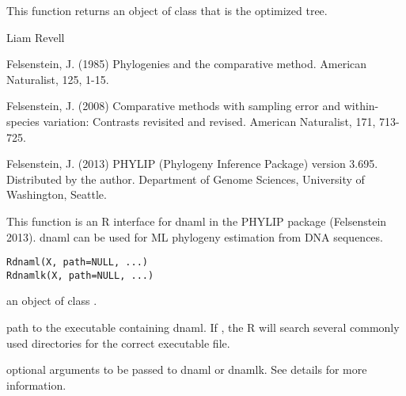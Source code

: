 \documentclass[a4paper]{book}
\begin{document}
%
\begin{Value}
This function returns an object of class  that is the optimized tree.
\end{Value}
%
\begin{Author}\relax
Liam Revell 
\end{Author}
%
\begin{References}\relax
Felsenstein, J. (1985) Phylogenies and the comparative method. American Naturalist, 125, 1-15.

Felsenstein, J. (2008) Comparative methods with sampling error and within-species variation: Contrasts revisited and revised. American Naturalist, 171, 713-725.

Felsenstein, J. (2013) PHYLIP (Phylogeny Inference Package) version 3.695. Distributed by the author. Department of Genome Sciences, University of Washington, Seattle.
\end{References}
%
\begin{SeeAlso}\relax
{}
\end{SeeAlso}
%
\begin{Description}\relax
This function is an R interface for dnaml in the PHYLIP package (Felsenstein 2013). dnaml can be used for ML phylogeny estimation from DNA sequences.
\end{Description}
%
\begin{Usage}
\begin{verbatim}
Rdnaml(X, path=NULL, ...)
Rdnamlk(X, path=NULL, ...)
\end{verbatim}
\end{Usage}
%
\begin{Arguments}
\begin{ldescription}
\item[\code{X}] an object of class .
\item[\code{path}] path to the executable containing dnaml. If , the R will search several commonly used directories for the correct executable file.
\item[\code{...}] optional arguments to be passed to dnaml or dnamlk. See details for more information.
\end{ldescription}
\end{Arguments}
%
\end{document}
